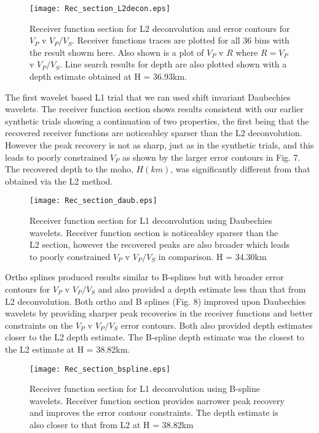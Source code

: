 \documentclass[jgrga]{agutex}
\begin{document}
\begin{article}
\begin{figure}
\noindent\texttt{[image: Rec\_section\_L2decon.eps]}
\caption{Receiver function section for L2 deconvolution and error contours for $V_{P}$ v $V_{P}/V_{S}$. Receiver functions traces are plotted for all 36 bins with the result showm here. Also shown is a plot of $V_{P}$ v $R$ where $R=V_{P}$ v $V_{P}/V_{S}$. Line search results for depth are also plotted shown with a depth estimate obtained at H = 36.93km.}
\end{figure}

The first wavelet based L1 trial that we ran used shift invariant Daubechies wavelets. The receiver function section shows results consistent with our earlier synthetic trials showing a continuation of two properties, the first being that the recovered receiver functions are noticeabley sparser than the L2 deconvolution. However the peak recovery is not as sharp, just as in the synthetic trials, and this leads to poorly constrained $V_{P}$ as shown by the larger error contours in Fig. 7. The recovered depth to the moho, $H(km)$, was significantly different from that obtained via the L2 method. 

\begin{figure}
\noindent\texttt{[image: Rec\_section\_daub.eps]}
\caption{Receiver function section for L1 deconvolution using Daubechies wavelets. Receiver function section is noticeabley sparser than the L2 section, however the recovered peaks are also broader which leads to poorly constrained $V_{P}$ v $V_{P}/V_{S}$ in comparison. H = 34.30km}
\end{figure}

Ortho splines produced results similar to B-splines but with broader error contours for $V_{P}$ v $V_{P}/V_{S}$ and also provided a depth estimate less than that from L2 deconvolution. Both ortho and B splines (Fig. 8) improved upon Daubechies wavelets by providing sharper peak recoveries in the receiver functions and better constraints on the $V_{P}$ v $V_{P}/V_{S}$ error contours. Both also provided depth estimates closer to the L2 depth estimate. The B-spline depth estimate was the closest to the L2 estimate at H = 38.82km.  

\begin{figure}
\noindent\texttt{[image: Rec\_section\_bspline.eps]}
\caption{Receiver function section for L1 deconvolution using B-spline wavelets. Receiver function section provides narrower peak recovery and improves the error contour constraints. The depth estimate is also closer to that from L2 at H = 38.82km }
\end{figure}


\end{article}
\end{document}
